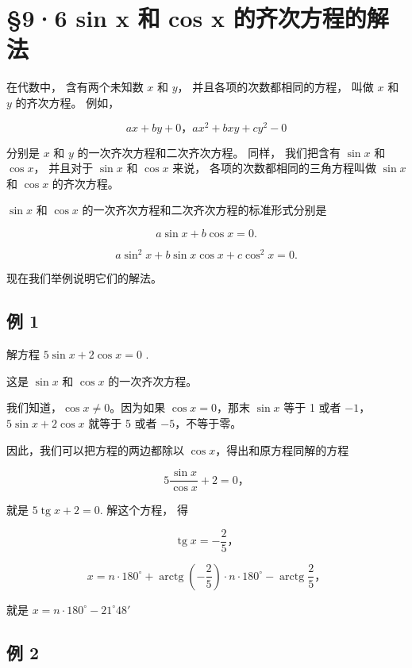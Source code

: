 \section{§9·6 sin x 和 cos x 的齐次方程的解法}\label{sin-x-ux548c-cos-x-ux7684ux9f50ux6b21ux65b9ux7a0bux7684ux89e3ux6cd5}

在代数中， 含有两个未知数 \(x\) 和 \(y\)， 并且各项的次数都相同的方程，
叫做 \(x\) 和 \(y\) 的齐次方程。 例如，

\[
a x + b y + 0\text{，} a x ^ {2} + b x y + c y ^ {2} - 0
\]

分别是 \(x\) 和 \(y\) 的一次齐次方程和二次齐次方程。 同样， 我们把含有
\(\sin x\) 和 \(\cos x\)， 并且对于 \(\sin x\) 和 \(\cos x\) 来说，
各项的次数都相同的三角方程叫做 \(\sin x\) 和 \(\cos x\) 的齐次方程。

\(\sin x\) 和 \(\cos x\) 的一次齐次方程和二次齐次方程的标准形式分别是

\[
a \sin x + b \cos x = 0.
\]

\[
a \sin^ {2} x + b \sin x \cos x + c \cos^ {2} x = 0.
\]

现在我们举例说明它们的解法。

\subsection{例 1}

解方程 \(5\sin x + 2\cos x = 0\) .

 这是 \(\sin x\) 和 \(\cos x\) 的一次齐次方程。

我们知道，\(\cos x \neq 0\)。因为如果 \(\cos x = 0\)，那末 \(\sin x\)
等于 1 或者 \(-1\)，\(5\sin x+2\cos x\) 就等于 5 或者 \(-5\)，不等于零。

因此，我们可以把方程的两边都除以 \(\cos x\)，得出和原方程同解的方程

\[
5 \frac {\sin x}{\cos x} + 2 = 0\text{，}
\]

就是 \(5\operatorname{tg}x+2=0.\) 解这个方程， 得

\[
\operatorname{tg} x = - \frac {2}{5}\text{，}
\]

\[
x = n \cdot 180 ^{\circ} + \operatorname{arctg} \left(- \frac {2}{5}\right) \cdot n \cdot 180 ^{\circ} - \operatorname{arctg} \frac {2}{5}\text{，}
\]

就是 \(x=n\cdot180^{\circ}-21^{\circ}48'\)

\subsection{例 2}

